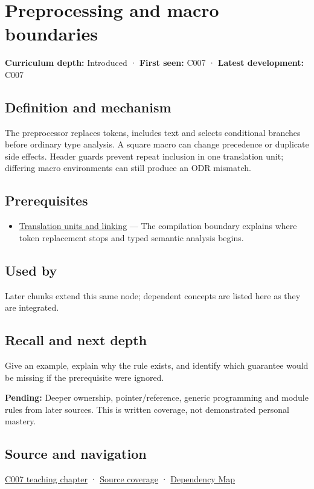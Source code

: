 \hypertarget{appendix-33c0a92ce855}{}\label{referencestart:appendix-33c0a92ce855}
\section{Preprocessing and macro boundaries}\label{appendix-33c0a92ce855-preprocessing-and-macro-boundaries}

\textbf{Curriculum depth:} Introduced · \textbf{First seen:} C007 · \textbf{Latest development:} C007

\subsection{Definition and mechanism}\label{appendix-33c0a92ce855-definition-and-mechanism}

The preprocessor replaces tokens, includes text and selects conditional branches before ordinary type analysis. A square macro can change precedence or duplicate side effects. Header guards prevent repeat inclusion in one translation unit; differing macro environments can still produce an ODR mismatch.

\subsection{Prerequisites}\label{appendix-33c0a92ce855-prerequisites}

\begin{itemize}
\tightlist
\item
  \hyperref[appendix-806686359e1b]{Translation units and linking} --- The compilation boundary explains where token replacement stops and typed semantic analysis begins.
\end{itemize}

\subsection{Used by}\label{appendix-33c0a92ce855-used-by}

Later chunks extend this same node; dependent concepts are listed here as they are integrated.

\subsection{Recall and next depth}\label{appendix-33c0a92ce855-recall-and-next-depth}

Give an example, explain why the rule exists, and identify which guarantee would be missing if the prerequisite were ignored.

\textbf{Pending:} Deeper ownership, pointer/reference, generic programming and module rules from later sources. This is written coverage, not demonstrated personal mastery.

\subsection{Source and navigation}\label{appendix-33c0a92ce855-source-and-navigation}

\hyperref[01-foundations-i-ch002-giving-a-program-a-buildable-shape]{C007 teaching chapter} · \hyperref[appendix-fd090d982a15-m007---parts-101-112]{Source coverage} · \hyperref[appendix-4ad47bdd269a]{Dependency Map}
